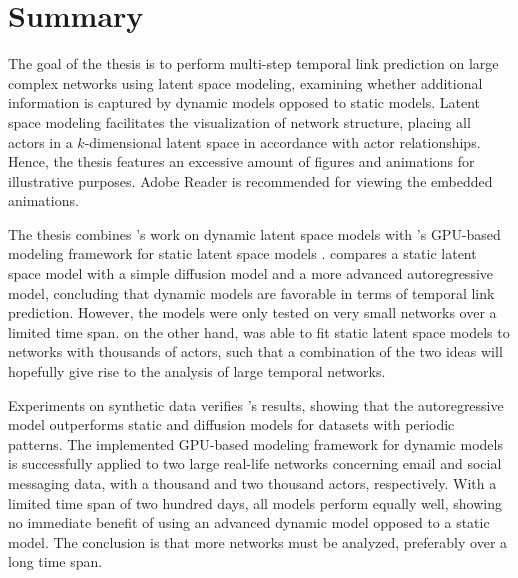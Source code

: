 \chapter{Summary}

The goal of the thesis is to perform multi-step temporal link prediction on large complex networks using latent space modeling, examining whether additional information is captured by dynamic models opposed to static models.
Latent space modeling facilitates the visualization of network structure, placing all actors in a $k$-dimensional latent space in accordance with actor relationships. Hence, the thesis features an excessive amount of figures and animations for illustrative purposes. Adobe Reader is recommended for viewing the embedded animations.

The thesis combines \citeauthor{zangenberg2018a}'s work on dynamic latent space models \cite{zangenberg2018a} with \citeauthor{jacobsen2018a}'s GPU-based modeling framework for static latent space models \cite{jacobsen2018a}. \citeauthor{zangenberg2018a} compares a static latent space model with a simple diffusion model and a more advanced autoregressive model, concluding that dynamic models are favorable in terms of temporal link prediction. However, the models were only tested on very small networks over a limited time span. \citeauthor{jacobsen2018a} on the other hand, was able to fit static latent space models to networks with thousands of actors, such that a combination of the two ideas will hopefully give rise to the analysis of large temporal networks.

Experiments on synthetic data verifies \citeauthor{zangenberg2018a}'s results, showing that the autoregressive model outperforms static and diffusion models for datasets with periodic patterns.
The implemented GPU-based modeling framework for dynamic models is successfully applied to two large real-life networks concerning email and social messaging data, with a thousand and two thousand actors, respectively.
With a limited time span of two hundred days, all models perform equally well, showing no immediate benefit of using an advanced dynamic model opposed to a static model. The conclusion is that more networks must be analyzed, preferably over a long time span.


